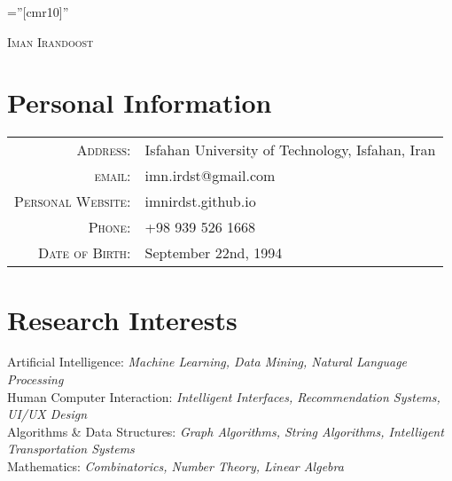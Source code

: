 \documentclass[a4paper,10pt]{article}
\makeatletter
\newcommand{\interestItem}[2]{
	\textbullet\textnormal{ #1: }\emph{\color{darkgray}\small #2}}
\newcommand{\linkSign}{
	{\footnotesize\space\faExternalLink}}
\newcommand{\myEmailLink}{mailto:imn.irdst@gmail.com}
\newcommand{\mySiteLink}{https://imnirdst.github.io/}
\makeatother
\begin{document}
	
	\pagestyle{empty} %
	
	\font\fb=''[cmr10]'' %
	
	\par{\centering
		{\Huge \textsc{Iman Irandoost}
		}\bigskip\par}
	
	
	\section{Personal Information}
		\begin{tabular}{rl}
			\textsc{Address:}   & Isfahan University of Technology, Isfahan, Iran \\
			\textsc{email:}     & imn.irdst@gmail.com\href{\myEmailLink}{\linkSign}\\
			\textsc{Personal Website:}     & imnirdst.github.io\href{\mySiteLink}{\linkSign}\\
			\textsc{Phone:}     & +98 939 526 1668\\
			\textsc{Date of Birth:} & September 22nd, 1994
		\end{tabular}
	\section{Research Interests}
		\interestItem{Artificial Intelligence}{Machine Learning, Data Mining, Natural Language Processing}\vspace{1 mm}\\
		\interestItem{Human Computer Interaction}{Intelligent Interfaces, Recommendation Systems, UI/UX Design}\vspace{1 mm} \\
		\interestItem{Algorithms \& Data Structures}{Graph Algorithms, String Algorithms, Intelligent Transportation Systems}\vspace{1 mm}\\
		\interestItem{Mathematics}{Combinatorics, Number Theory, Linear Algebra}
\end{document}
